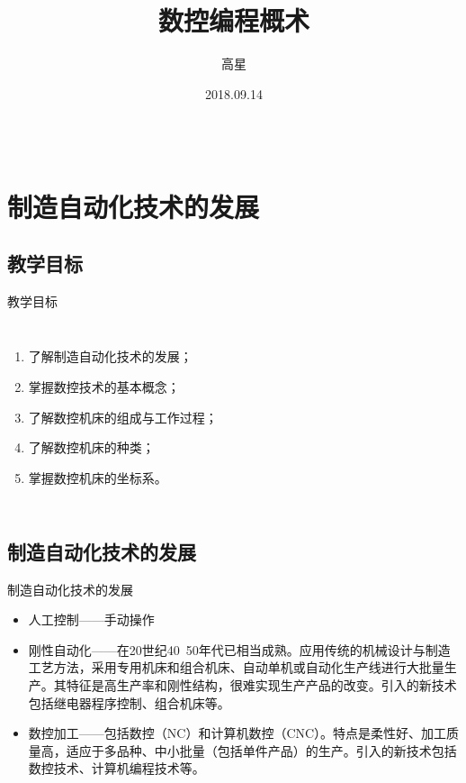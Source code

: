 \documentclass[UTF8,zihao=-4]{ctexbeamer}
\title{数控编程概术}
\author{高星}
\institute{湖南潇湘技师学院~湖南九嶷职院}
\date{2018.09.14}
\begin{document}
\begin{frame}[plain]
		\maketitle
\end{frame}

\begin{frame}
\begin{columns}
\tableofcontents[hideallsubsections]
\end{columns}
\end{frame}

\section{制造自动化技术的发展}
\subsection{教学目标}
\begin{frame}{教学目标}
\begin{columns}
	\begin{enumerate}
	\item 了解制造自动化技术的发展；
	\item 掌握数控技术的基本概念；
	\item 了解数控机床的组成与工作过程；
	\item 了解数控机床的种类；
	\item 掌握数控机床的坐标系。
\end{enumerate}
\end{columns}
\end{frame}

\subsection{制造自动化技术的发展}
\begin{frame}[<+->]{制造自动化技术的发展}
	\begin{itemize}
		\item 人工控制——手动操作
		\item 刚性自动化——在20世纪40~50年代已相当成熟。应用传统的机械设计与制造工艺方法，采用专用机床和组合机床、自动单机或自动化生产线进行大批量生产。其特征是高生产率和刚性结构，很难实现生产产品的改变。引入的新技术包括继电器程序控制、组合机床等。 
		\item 数控加工——包括数控（NC）和计算机数控（CNC）。特点是柔性好、加工质量高，适应于多品种、中小批量（包括单件产品）的生产。引入的新技术包括数控技术、计算机编程技术等。
	\end{itemize}
\end{frame}
\end{document}
